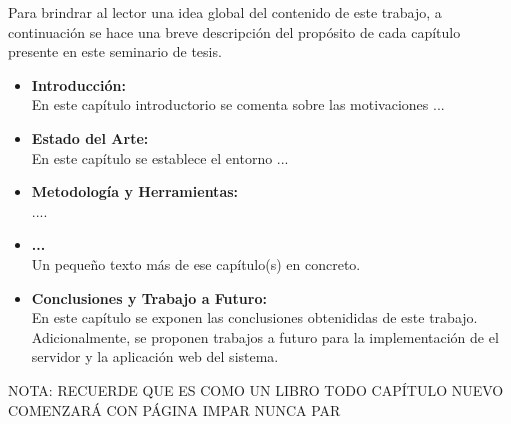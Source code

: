 Para brindrar al lector una idea global del contenido de este trabajo, a continuación se hace una breve descripción del propósito de cada capítulo presente en este seminario de tesis.
\begin{itemize}

\item \textbf{Introducción:} \\
En este capítulo introductorio se comenta sobre las motivaciones ...

\item \textbf{Estado del Arte:} \\
En este capítulo se establece el entorno ...

\item \textbf{Metodología y Herramientas:} \\
....

\item \textbf{...} \\
Un pequeño texto más de ese capítulo(s) en concreto.

\item \textbf{Conclusiones y Trabajo a Futuro:}\\
En este capítulo se exponen las conclusiones obtenididas de este trabajo. Adicionalmente, se proponen trabajos a futuro para la implementación de el servidor y la aplicación web del sistema.
\end{itemize}

NOTA: RECUERDE QUE ES COMO UN LIBRO TODO CAPÍTULO NUEVO COMENZARÁ CON PÁGINA IMPAR NUNCA PAR


